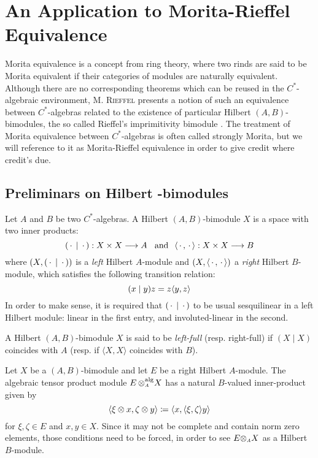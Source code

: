 \chapter{An Application to Morita-Rieffel Equivalence}

Morita equivalence is a concept from ring theory, where two rinds are said to be Morita equivalent if their categories of modules are naturally equivalent. Although there are no corresponding theorems which can be reused in the $C^*$-algebraic environment, \textsc{M. Rieffel} presents a notion of such an equivalence between $C^*$-algebras related to the existence of particular Hilbert $(A,B)$-bimodules, the so called Rieffel's imprimitivity bimodule \cite{rieffel1981c,RIEFFEL1974176, brown1977stable}. The treatment of Morita equivalence between $C^*$-algebras is often called strongly Morita, but we will reference to it as Morita-Rieffel equivalence in order to give credit where credit's due.

\section[Preliminars on Hilbert \texorpdfstring{\ensuremath{C^*}}{C*}-bimodules]{Preliminars on Hilbert \texorpdfstring{}{C*}-bimodules}

Let $A$ and $B$ be two $C^*$-algebras. A Hilbert $(A,B)$-bimodule $X$ is a space with two inner products:
\begin{equation*}
	(\operatorname{\,\cdot\,}\mid\operatorname{\,\cdot\,}):X\times X \longrightarrow A \hspace{0.25cm}\operatorname{and}\hspace{0.25cm} \langle {\operatorname{\,\cdot\,}},{\operatorname{\,\cdot\,}}\rangle:X\times X \longrightarrow B
\end{equation*} 
where $\left(X, (\operatorname{\,\cdot\,}\mid\operatorname{\,\cdot\,})\right)$ is a \textit{left} Hilbert $A$-module and $\left(X, \langle {\operatorname{\,\cdot\,}},{\operatorname{\,\cdot\,}}\rangle\right)$ a \textit{right} Hilbert $B$-module, which satisfies the following transition relation:
\begin{equation*}
	(x\mid y)z = z \langle {y},{z}\rangle
\end{equation*}
In order to make sense, it is required that $(\operatorname{\,\cdot\,}\mid\operatorname{\,\cdot\,})$ to be usual sesquilinear in a left Hilbert module: linear in the first entry, and involuted-linear in the second.

\begin{definicao}
	A Hilbert $(A,B)$-bimodule $X$ is said to be \textit{left-full} (resp. right-full) if $(X \mid X)$ coincides with $A$ (resp. if $\langle X, X\rangle$ coincides with $B$).
\end{definicao}

Let $X$ be a $(A,B)$-bimodule and let $E$ be a right Hilbert $A$-module. The algebraic tensor product module $E\,\sub\otimes A^{\text{alg}} X$ has a natural $B$-valued inner-product given by
\begin{equation*}
	\langle {\xi\otimes x},{\zeta \otimes y}\rangle \coloneqq \langle {x},{\langle {\xi},{\zeta}\rangle y}\rangle
\end{equation*}
for $\xi,\zeta\in E$ and $x,y\in X$. Since it may not be complete and contain norm zero elements, those conditions need to be forced, in order to see $E \sub\otimes A X$ as a Hilbert $B$-module.

